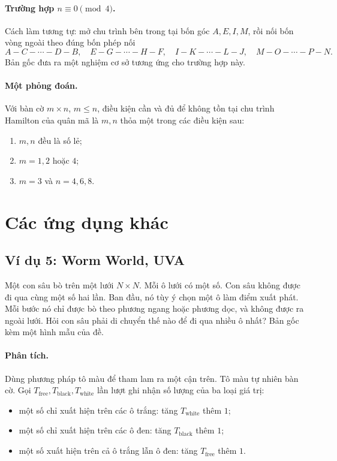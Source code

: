 \documentclass[11pt]{article}
\begin{document}
\paragraph{Trường hợp \(n\equiv0\pmod 4\).}
Cách làm tương tự: mở chu trình bên trong tại bốn góc \(A,E,I,M\), rồi nối
bốn vòng ngoài theo đúng bốn phép nối
\[
  A-C-\cdots-D-B,\quad
  E-G-\cdots-H-F,\quad
  I-K-\cdots-L-J,\quad
  M-O-\cdots-P-N.
\]
Bản gốc đưa ra một nghiệm cơ sở tương ứng cho trường hợp này.

\paragraph{Một phỏng đoán.}
Với bàn cờ \(m\times n\), \(m\le n\), điều kiện cần và đủ để không tồn tại
chu trình Hamilton của quân mã là \(m,n\) thỏa một trong các điều kiện sau:
\begin{enumerate}
  \item \(m,n\) đều là số lẻ;
  \item \(m=1,2\) hoặc \(4\);
  \item \(m=3\) và \(n=4,6,8\).
\end{enumerate}

\section{Các ứng dụng khác}

\subsection{Ví dụ 5: Worm World, UVA}

Một con sâu bò trên một lưới \(N\times N\). Mỗi ô lưới có một số. Con sâu
không được đi qua cùng một số hai lần. Ban đầu, nó tùy ý chọn một ô làm điểm
xuất phát. Mỗi bước nó chỉ được bò theo phương ngang hoặc phương dọc, và không
được ra ngoài lưới. Hỏi con sâu phải di chuyển thế nào để đi qua nhiều ô nhất?
Bản gốc kèm một hình mẫu của đề.

\paragraph{Phân tích.}
Dùng phương pháp tô màu để tham lam ra một cận trên. Tô màu tự nhiên bàn cờ.
Gọi \(T_{\text{free}},T_{\text{black}},T_{\text{white}}\) lần lượt ghi nhận
số lượng của ba loại giá trị:
\begin{itemize}
  \item một số chỉ xuất hiện trên các ô trắng: tăng \(T_{\text{white}}\) thêm
        \(1\);
  \item một số chỉ xuất hiện trên các ô đen: tăng \(T_{\text{black}}\) thêm
        \(1\);
  \item một số xuất hiện trên cả ô trắng lẫn ô đen: tăng
        \(T_{\text{free}}\) thêm \(1\).
\end{itemize}
\end{document}
